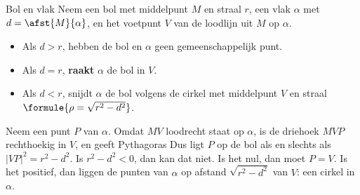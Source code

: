\begin{theorie}
\begin{stelling}{Bol en vlak}
Neem een bol met middelpunt $M$ en straal $r$, een vlak $\alpha$ met $d = \afst{M}{\alpha}$, en het voetpunt $V$ van de loodlijn uit $M$ op $\alpha$.
\begin{itemize}
\item Als $d > r$, hebben de bol en $\alpha$ geen gemeenschappelijk punt.
\item Als $d = r$, \textbf{\textcolor{accent}{raakt}} $\alpha$ de bol in $V$.
\item Als $d < r$, snijdt $\alpha$ de bol volgens de cirkel met middelpunt $V$ en straal $\formule{\rho = \sqrt{r^2 - d^2}}$.
\end{itemize}
\end{stelling}

\begin{minipage}[t]{.58\linewidth}
\vspace{0pt}
\begin{bewijs}
Neem een punt $P$ van $\alpha$. Omdat $MV$ loodrecht staat op $\alpha$, is de driehoek $MVP$ rechthoekig in $V$, en geeft Pythagoras
Dus ligt $P$ op de bol als en slechts als $|VP|^2 = r^2 - d^2$. Is $r^2 - d^2 < 0$, dan kan dat niet. Is het nul, dan moet $P = V$. Is het positief, dan liggen de punten van $\alpha$ op afstand $\sqrt{r^2 - d^2}$ van $V$: een cirkel in $\alpha$.
\end{bewijs}
\end{minipage}\hfill
\begin{minipage}[t]{.38\linewidth}
\vspace{0pt}
\centering
{}
\end{minipage}
\end{theorie}

